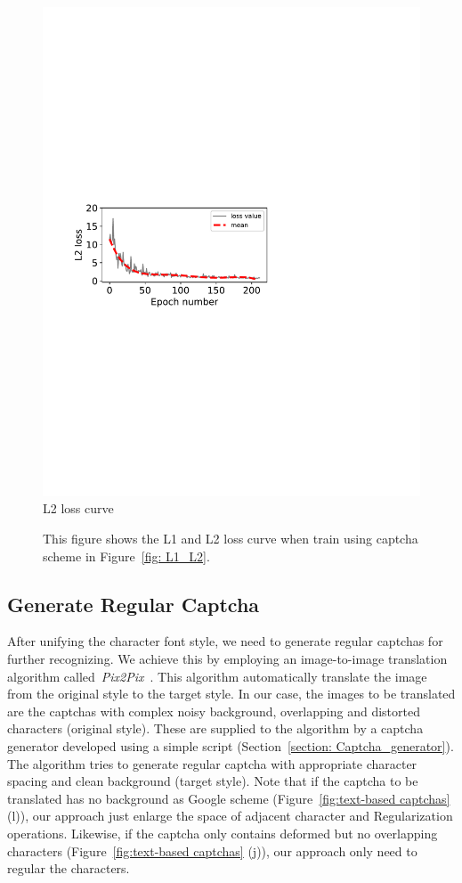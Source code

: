 \begin{figure}
{\begin{minipage}[t]{0.22\textwidth}
      \includegraphics[width=\textwidth]{fig/loss_anlysis/loss_L2.pdf}\\
      \center L2 loss curve
      \end{minipage}
  }
  \caption{This figure shows the L1 and L2 loss curve when train using captcha scheme in Figure~\ref{fig: L1_L2}.}
  \label{fig: loss_anlysis}
\end{figure}

\subsection{Generate Regular Captcha}
After unifying the character font style, we need to generate regular captchas for further recognizing. We achieve this by employing an image-to-image translation algorithm called~\emph{Pix2Pix}~\cite{Pix2PixCode}. This algorithm automatically translate the image from the original style to the target style. In our case, the images to be translated are the captchas with complex noisy background, overlapping and distorted characters (original style). These are supplied to the algorithm by a captcha generator developed using a simple script (Section~\ref{section: Captcha_generator}). The algorithm tries to generate regular captcha with appropriate character spacing and clean background (target style).
Note that if the captcha to be translated has no background as Google scheme (Figure~\ref{fig:text-based captchas} (l)), our approach just enlarge the space of adjacent character and Regularization operations. Likewise, if the captcha only contains deformed but no overlapping characters (Figure~\ref{fig:text-based captchas} (j)), our approach only need to regular the characters.

